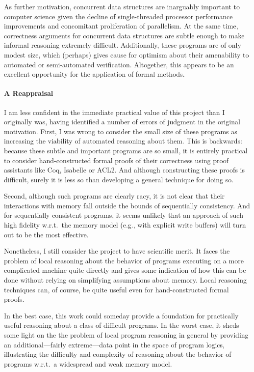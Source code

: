 \documentclass[11pt]{article}
\begin{document}
As further motivation, concurrent data structures are inarguably important to computer science given the decline of single-threaded processor performance improvements and concomitant proliferation of parallelism. At the same time, correctness arguments for concurrent data structures are subtle enough to make informal reasoning extremely difficult. Additionally, these programs are of only modest size, which (perhaps) gives cause for optimism about their amenability to automated or semi-automated verification. Altogether, this appears to be an excellent opportunity for the application of formal methods. 

\paragraph{A Reappraisal}

I am less confident in the immediate practical value of this project than I originally was, having identified a number of errors of judgment in the original motivation. First, I was wrong to consider the small size of these programs as increasing the viability of automated reasoning about them. This is backwards: because these subtle and important programs are so small, it is entirely practical to consider hand-constructed formal proofs of their correctness using proof assistants like Coq, Isabelle or ACL2. And although constructing these proofs is difficult, surely it is less so than developing a general technique for doing so. 

Second, although such programs are clearly racy, it is not clear that their interactions with memory fall outside the bounds of sequentially consistency. And for sequentially consistent programs, it seems unlikely that an approach of such high fidelity w.r.t.~the memory model (e.g., with explicit write buffers) will turn out to be the most effective. 

Nonetheless, I still consider the project to have scientific merit. It faces the problem of local reasoning about the behavior of programs executing on a more complicated machine quite directly and gives some indication of how this can be done without relying on simplifying assumptions about memory. Local reasoning techniques can, of course, be quite useful even for hand-constructed formal proofs. 

In the best case, this work could someday provide a foundation for practically useful reasoning about a class of difficult programs. In the worst case, it sheds some light on the the problem of local program reasoning in general by providing an additional---fairly extreme---data point in the space of program logics, illustrating the difficulty and complexity of reasoning about the behavior of programs w.r.t.~a widespread and weak memory model. 
\end{document}
